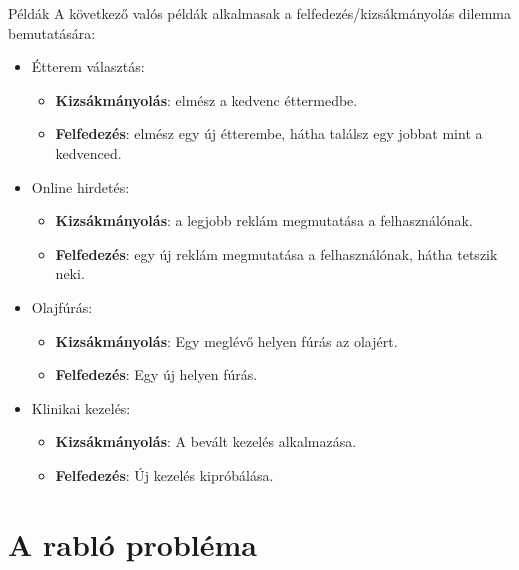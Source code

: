 \documentclass[english, aspectratio=169]{beamer}
\makeatletter
\let\origtableofcontents=\tableofcontents
\def\tableofcontents{\@ifnextchar[{\origtableofcontents}{\gobbletableofcontents}}
\def\gobbletableofcontents#1{\origtableofcontents}
\makeatother
\begin{document}
\begin{frame}{Példák}
A következő valós példák alkalmasak a felfedezés/kizsákmányolás dilemma bemutatására:
\begin{itemize}
	\item Étterem választás:
	\begin{itemize}
		\item \textbf{Kizsákmányolás}: elmész a kedvenc éttermedbe.
		\item \textbf{Felfedezés}: elmész egy új étterembe, hátha találsz egy jobbat mint a kedvenced.
	\end{itemize}
	\item Online hirdetés:
	\begin{itemize}
		\item \textbf{Kizsákmányolás}: a legjobb reklám megmutatása a felhasználónak.
		\item \textbf{Felfedezés}: egy új reklám megmutatása a felhasználónak, hátha tetszik neki.
	\end{itemize}
	\item Olajfúrás:
	\begin{itemize}
		\item \textbf{Kizsákmányolás}: Egy meglévő helyen fúrás az olajért.
		\item \textbf{Felfedezés}: Egy új helyen fúrás.
	\end{itemize}
	\item Klinikai kezelés:
	\begin{itemize}
		\item \textbf{Kizsákmányolás}: A bevált kezelés alkalmazása.
		\item \textbf{Felfedezés}: Új kezelés kipróbálása.
	\end{itemize}
\end{itemize}
\end{frame}

\section{A rabló probléma}

\begin{frame}
\tableofcontents[currentsection]
\end{frame}
\end{document}
